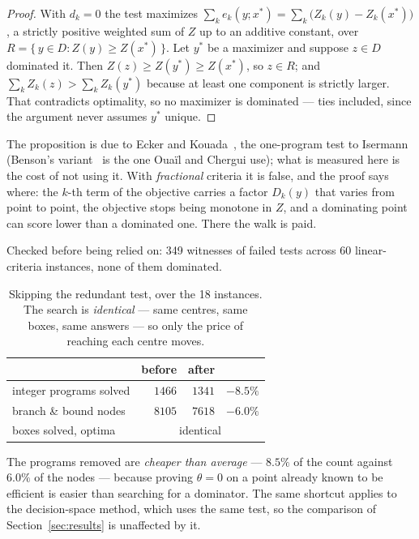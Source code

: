 \documentclass[11pt,a4paper]{article}
\newcommand{\Z}{Z}
\newcommand{\Dset}{D}
\begin{document}
\begin{proof}
With $d_k = 0$ the test maximizes
$\sum_k e_k(y; x^{*}) = \sum_k \bigl(\Z_k(y) - \Z_k(x^{*})\bigr)$, a strictly
positive weighted sum of $\Z$ up to an additive constant, over
$R = \{\, y \in \Dset : \Z(y) \geqslant \Z(x^{*}) \,\}$. Let $y^{*}$ be a
maximizer and suppose $z \in \Dset$ dominated it. Then
$\Z(z) \geqslant \Z(y^{*}) \geqslant \Z(x^{*})$, so $z \in R$; and
$\sum_k \Z_k(z) > \sum_k \Z_k(y^{*})$ because at least one component is
strictly larger. That contradicts optimality, so no maximizer is dominated ---
ties included, since the argument never assumes $y^{*}$ unique.
\end{proof}

\noindent
The proposition is due to Ecker and Kouada~\cite{eckerkouada}, the
one-program test to Isermann~\cite{isermann1974} (Benson's
variant~\cite{benson1978} is the one Oua\"il and Chergui use); what is
measured here is the cost
of not using it. With \emph{fractional} criteria it is false, and the proof
says where: the $k$-th term of the objective carries a factor $D_k(y)$ that
varies from point to point, the objective stops being monotone in $\Z$, and a
dominating point can score lower than a dominated one. There the walk is paid.

Checked before being relied on: 349 witnesses of failed tests across 60
linear-criteria instances, none of them dominated.

\begin{table}[h]
\centering
\caption{Skipping the redundant test, over the 18 instances. The search is
\emph{identical} --- same centres, same boxes, same answers --- so only the
price of reaching each centre moves.}
\begin{tabular}{lrrr}
\toprule
 & before & after & \\
\midrule
integer programs solved  & $1466$ & $1341$ & $-8.5\%$ \\
branch \& bound nodes     & $8105$ & $7618$ & $-6.0\%$ \\
boxes solved, optima     & \multicolumn{3}{c}{identical} \\
\bottomrule
\end{tabular}
\end{table}

\noindent
The programs removed are \emph{cheaper than average} --- $8.5\%$ of the count
against $6.0\%$ of the nodes --- because proving $\theta = 0$ on a point already
known to be efficient is easier than searching for a dominator. The same
shortcut applies to the decision-space method, which uses the same test, so the
comparison of Section~\ref{sec:results} is unaffected by it.
\end{document}
